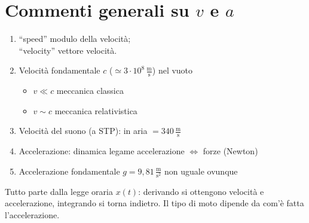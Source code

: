 \documentclass[11pt,a4paper,openany]{report}
\begin{document}
\section{Commenti generali su \texorpdfstring{$v$ e $a$}{v e a}}
\begin{enumerate}
  \item ``speed'' \implica modulo della velocità;\\
        ``velocity'' \implica vettore velocità.
  \item Velocità fondamentale \implica $c$ ($\simeq 3\cdot 10^{8}\,\frac{\mathrm{m}}{\mathrm{s}}$) nel vuoto
        \begin{itemize}[nosep]
          \item $v \ll c$ \implica meccanica classica
          \item $v \sim c$ \implica meccanica relativistica
        \end{itemize}
  \item Velocità del suono (a STP): in aria $= 340\,\frac{\mathrm{m}}{\mathrm{s}}$
  \item Accelerazione: dinamica \implica legame accelerazione $\Leftrightarrow$ forze (Newton)
  \item Accelerazione fondamentale \implica $g = 9{,}81\,\frac{\mathrm{m}}{\mathrm{s}^2}$
        \implica non uguale ovunque
\end{enumerate}


Tutto parte dalla legge oraria $x(t)$: derivando si ottengono velocità e accelerazione,
integrando si torna indietro. Il tipo di moto dipende da com'è fatta l'accelerazione.
\end{document}
